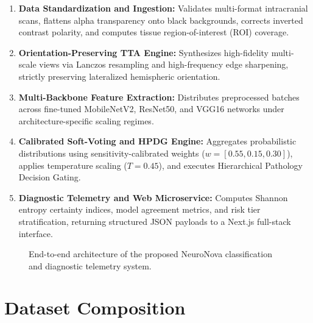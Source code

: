 \documentclass[runningheads]{llncs}
\begin{document}
\begin{enumerate}
    \item \textbf{Data Standardization and Ingestion:} Validates multi-format intracranial scans, flattens alpha transparency onto black backgrounds, corrects inverted contrast polarity, and computes tissue region-of-interest (ROI) coverage.
    \item \textbf{Orientation-Preserving TTA Engine:} Synthesizes high-fidelity multi-scale views via Lanczos resampling and high-frequency edge sharpening, strictly preserving lateralized hemispheric orientation.
    \item \textbf{Multi-Backbone Feature Extraction:} Distributes preprocessed batches across fine-tuned MobileNetV2, ResNet50, and VGG16 networks under architecture-specific scaling regimes.
    \item \textbf{Calibrated Soft-Voting and HPDG Engine:} Aggregates probabilistic distributions using sensitivity-calibrated weights ($w = [0.55, 0.15, 0.30]$), applies temperature scaling ($T=0.45$), and executes Hierarchical Pathology Decision Gating.
    \item \textbf{Diagnostic Telemetry and Web Microservice:} Computes Shannon entropy certainty indices, model agreement metrics, and risk tier stratification, returning structured JSON payloads to a Next.js full-stack interface.
\end{enumerate}

\begin{figure}[t]
\centering
{}
\caption{End-to-end architecture of the proposed NeuroNova classification and diagnostic telemetry system.}
\label{fig:architecture}
\end{figure}

\section{Dataset Composition}
\end{document}
